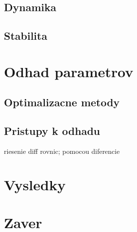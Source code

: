 \documentclass[fleqn]{article}
\begin{document}
\subsection{Dynamika}


\subsection{Stabilita}

\newpage

\section{Odhad parametrov}
\subsection{Optimalizacne metody} %

\subsection{Pristupy k odhadu} %
riesenie diff rovnic; pomocou diferencie

\section{Vysledky} %

\section{Zaver} %

\newpage


\end{document}

